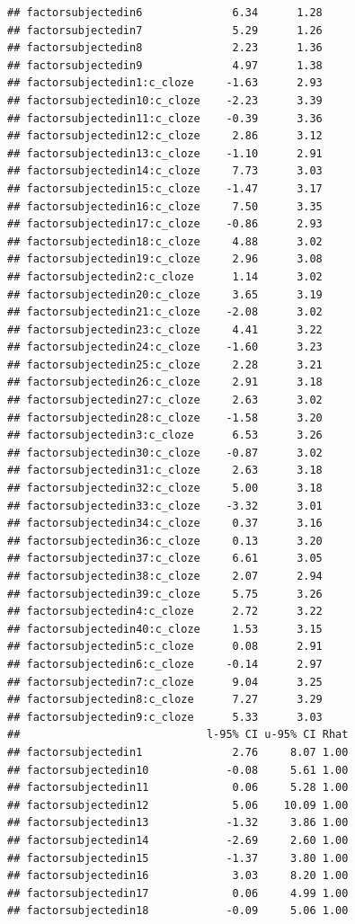 \documentclass[12pt,ignorenonframetext,aspectratio=169]{beamer}
\begin{document}
\begin{frame}[fragile]
\begin{verbatim}
## factorsubjectedin6              6.34      1.28
## factorsubjectedin7              5.29      1.26
## factorsubjectedin8              2.23      1.36
## factorsubjectedin9              4.97      1.38
## factorsubjectedin1:c_cloze     -1.63      2.93
## factorsubjectedin10:c_cloze    -2.23      3.39
## factorsubjectedin11:c_cloze    -0.39      3.36
## factorsubjectedin12:c_cloze     2.86      3.12
## factorsubjectedin13:c_cloze    -1.10      2.91
## factorsubjectedin14:c_cloze     7.73      3.03
## factorsubjectedin15:c_cloze    -1.47      3.17
## factorsubjectedin16:c_cloze     7.50      3.35
## factorsubjectedin17:c_cloze    -0.86      2.93
## factorsubjectedin18:c_cloze     4.88      3.02
## factorsubjectedin19:c_cloze     2.96      3.08
## factorsubjectedin2:c_cloze      1.14      3.02
## factorsubjectedin20:c_cloze     3.65      3.19
## factorsubjectedin21:c_cloze    -2.08      3.02
## factorsubjectedin23:c_cloze     4.41      3.22
## factorsubjectedin24:c_cloze    -1.60      3.23
## factorsubjectedin25:c_cloze     2.28      3.21
## factorsubjectedin26:c_cloze     2.91      3.18
## factorsubjectedin27:c_cloze     2.63      3.02
## factorsubjectedin28:c_cloze    -1.58      3.20
## factorsubjectedin3:c_cloze      6.53      3.26
## factorsubjectedin30:c_cloze    -0.87      3.02
## factorsubjectedin31:c_cloze     2.63      3.18
## factorsubjectedin32:c_cloze     5.00      3.18
## factorsubjectedin33:c_cloze    -3.32      3.01
## factorsubjectedin34:c_cloze     0.37      3.16
## factorsubjectedin36:c_cloze     0.13      3.20
## factorsubjectedin37:c_cloze     6.61      3.05
## factorsubjectedin38:c_cloze     2.07      2.94
## factorsubjectedin39:c_cloze     5.75      3.26
## factorsubjectedin4:c_cloze      2.72      3.22
## factorsubjectedin40:c_cloze     1.53      3.15
## factorsubjectedin5:c_cloze      0.08      2.91
## factorsubjectedin6:c_cloze     -0.14      2.97
## factorsubjectedin7:c_cloze      9.04      3.25
## factorsubjectedin8:c_cloze      7.27      3.29
## factorsubjectedin9:c_cloze      5.33      3.03
##                             l-95% CI u-95% CI Rhat
## factorsubjectedin1              2.76     8.07 1.00
## factorsubjectedin10            -0.08     5.61 1.00
## factorsubjectedin11             0.06     5.28 1.00
## factorsubjectedin12             5.06    10.09 1.00
## factorsubjectedin13            -1.32     3.86 1.00
## factorsubjectedin14            -2.69     2.60 1.00
## factorsubjectedin15            -1.37     3.80 1.00
## factorsubjectedin16             3.03     8.20 1.00
## factorsubjectedin17             0.06     4.99 1.00
## factorsubjectedin18            -0.09     5.06 1.00

\end{verbatim}
\end{frame}
\end{document}

